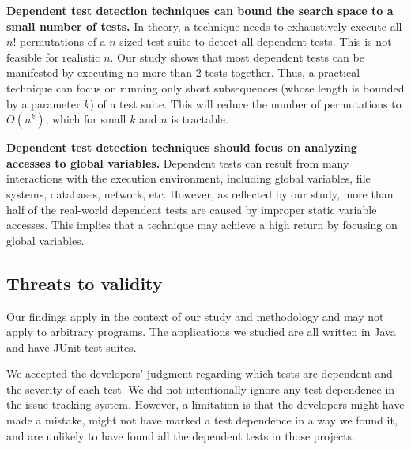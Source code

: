 \vspace{1mm}
\noindent \textbf{Dependent test detection techniques
can bound the search space to a small number of tests.}
In theory, a technique needs to exhaustively execute
all $n!$ permutations of a $n$-sized
test suite to detect all dependent tests. This is
not feasible for realistic $n$.  Our study shows that
most dependent tests can be manifested by executing
no more than 2 tests together. Thus, a practical technique
can focus on running only short subsequences (whose
length is bounded by a parameter $k$)
of a test suite. This will reduce the number of permutations
to $O(n^k)$, which for small $k$ and $n$ is tractable.

\vspace{1mm}
\noindent \textbf{Dependent test detection techniques
should focus on analyzing accesses to global variables.}
Dependent tests can result from many
interactions with the execution environment, including
global variables, file systems, databases, network, etc.
However, as reflected by our study, more than half of the
real-world dependent tests are caused
by improper static variable accesses. This implies that a technique
may achieve a high return by focusing on global variables.




\subsection{Threats to validity}

Our findings apply in the context of our study and methodology and may not
apply to arbitrary programs.
The applications we studied are all written in 
Java and have JUnit test suites.  

We accepted the developers' judgment regarding which tests are dependent
and the severity of each test.  We did not intentionally ignore
any test dependence in the issue tracking system.
However, a limitation is that the developers might have made a mistake,
might not have marked a test dependence in a way we found it, and are
unlikely to have found all the dependent tests in those projects. 


